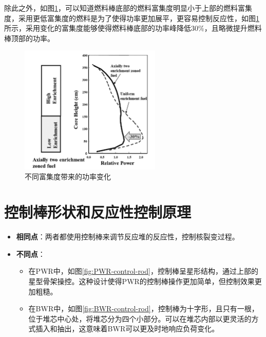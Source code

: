 \documentclass{article}
\begin{document}
除此之外，如图\ref{fig:BWR-power-distribution}，可以知道燃料棒底部的燃料富集度明显小于上部的燃料富集度，采用更低富集度的燃料是为了使得功率更加展平，更容易控制反应性，如图\ref{fig:BWR-power-distribution}所示，采用变化的富集度能够使得燃料棒底部的功率峰降低30\%，且略微提升燃料棒顶部的功率。

\begin{figure}[htbp]
    \centering
    \includegraphics[width=0.6\textwidth]{figures/BWR-power-distribution.png}
    \caption{不同富集度带来的功率变化}
    \label{fig:BWR-power-distribution}
\end{figure}

\section{控制棒形状和反应性控制原理}
\begin{itemize}
    \item \textbf{相同点}：两者都使用控制棒来调节反应堆的反应性，控制核裂变过程。
    \item \textbf{不同点}：
    \begin{itemize}
        \item 在PWR中，如图\ref{fig:PWR-control-rod}，控制棒呈星形结构，通过上部的星型骨架操控。这种设计使得PWR的控制棒操作更加简单，但控制效果更加粗糙。
        \item 在BWR中，如图\ref{fig:BWR-control-rod}，控制棒为十字形，且只有一根，位于堆芯中心处，将堆芯分为四个小部分。可以在堆芯内部以更灵活的方式插入和抽出，这意味着BWR可以更及时地响应负荷变化。
    \end{itemize}
\end{itemize}
\end{document}
